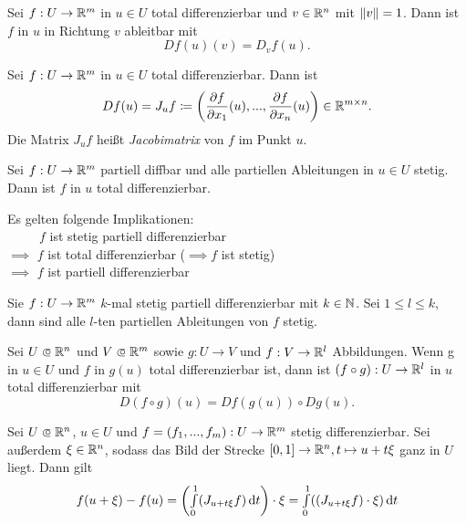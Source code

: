 \documentclass{cheat-sheet}
\begin{document}
\begin{satz}
Sei $f : U \to \mathbb{R}^m$ in $u \in U$ total differenzierbar und $v \in \mathbb{R}^n$ mit $\lVert v\rVert = 1$. Dann ist $f$ in $u$ in Richtung $v$ ableitbar mit
\[ D f(u) (v) = D_v f(u). \]
\end{satz}

\begin{defn}
Sei $f : U \to \mathbb{R}^m$ in $u \in U$ total differenzierbar. Dann ist
\[ D f(u) = J_u f \coloneqq \left( \frac{\partial f}{\partial x_1}(u), ..., \frac{\partial f}{\partial x_n}(u) \right) \in \mathbb{R}^{m \times n}. \]
Die Matrix $J_u f$ heißt \emph{Jacobimatrix} von $f$ im Punkt $u$.
\end{defn}


\begin{satz}
Sei $f : U \to \mathbb{R}^m$ partiell diffbar und alle partiellen Ableitungen in $u \in U$ stetig. Dann ist $f$ in $u$ total differenzierbar.
\end{satz}

\begin{bem}
Es gelten folgende Implikationen:\\
$\quad\quad\,\,\, f$ ist stetig partiell differenzierbar\\
$\implies$ $f$ ist total differenzierbar ($\!\implies f$ ist stetig)\\
$\implies$ $f$ ist partiell differenzierbar
\end{bem}

\begin{satz}
Sie $f : U \to \mathbb{R}^m$ $k$-mal stetig partiell differenzierbar mit $k \in \mathbb{N}$. Sei $1 \le l \le k$, dann sind alle $l$-ten partiellen Ableitungen von $f$ stetig.
\end{satz}

\begin{satz}[Kettenregel]
Sei $U \opn \R^n$ und $V \opn \R^m$ sowie $g : U \to V$ und $f : V \to \mathbb{R}^l$ Abbildungen. Wenn g in $u \in U$ und $f$ in $g(u)$ total differenzierbar ist, dann ist $(f \circ g) : U \to \mathbb{R}^l$ in $u$ total differenzierbar mit
\[ D(f \circ g)(u) = D f(g(u)) \circ D g(u). \]
\end{satz}


\begin{satz}[MWS]
Sei $U \opn \R^n$, $u \in U$ und $f = (f_1, ..., f_m) : U \to \mathbb{R}^m$ stetig differenzierbar. Sei außerdem $\xi \in \mathbb{R}^n$, sodass das Bild der Strecke $\left[ 0, 1 \right] \to \mathbb{R}^n, t \mapsto u + t \xi$ ganz in $U$ liegt. Dann gilt
\[ f(u + \xi) - f(u) = \left( {\textstyle \int\limits_{0}^{1}} (J_{u + t \xi} f) \,\mathrm{d} t \right) \cdot \xi = {\textstyle \int\limits_{0}^{1}} ((J_{u + t \xi} f) \cdot \xi) \,\mathrm{d} t \]
\end{satz}
\end{document}
